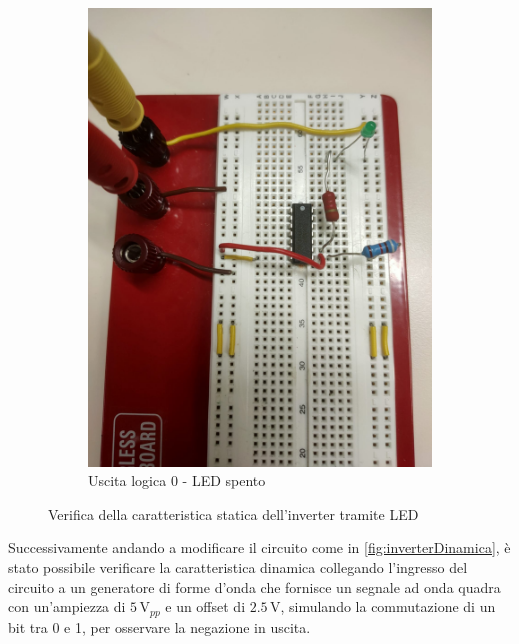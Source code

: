 \documentclass[a4paper,12pt]{article}
\begin{document}
\begin{figure}[h]
\begin{subfigure}[b]{0.40\textwidth}
		\includegraphics[width=\textwidth]{immagini/inverter/off.png}
		\caption{Uscita logica 0 - LED spento}
		\label{fig:led_off}
	\end{subfigure}
	\caption{Verifica della caratteristica statica dell'inverter tramite LED}
	\label{fig:statica}
\end{figure}


Successivamente andando a modificare il circuito come in \autoref{fig:inverterDinamica}, è stato possibile verificare la caratteristica dinamica collegando l’ingresso del circuito a un generatore di forme d’onda che fornisce un segnale ad onda quadra con un’ampiezza di $5\,\mathrm{V}_{pp}$ e un offset di $2.5\,\mathrm{V}$, simulando la commutazione di un bit tra 0 e 1, per osservare la negazione in uscita.
\end{document}
